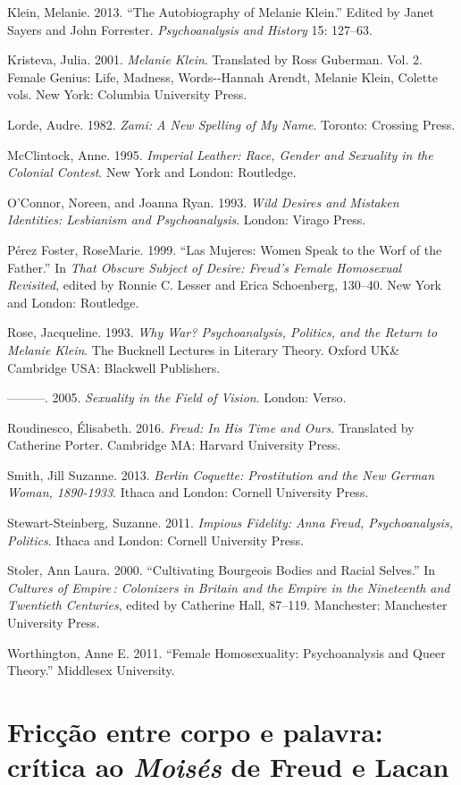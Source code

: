 Klein, Melanie. 2013. ``The Autobiography of Melanie Klein.'' Edited by
Janet Sayers and John Forrester. \emph{Psychoanalysis and History} 15:
127--63.

Kristeva, Julia. 2001. \emph{Melanie Klein}. Translated by Ross
Guberman. Vol. 2. Female Genius: Life, Madness, Words-\/-Hannah Arendt,
Melanie Klein, Colette vols. New York: Columbia University Press.

Lorde, Audre. 1982. \emph{Zami: A New Spelling of My Name}. Toronto:
Crossing Press.

McClintock, Anne. 1995. \emph{Imperial Leather: Race, Gender and
Sexuality in the Colonial Contest}. New York and London: Routledge.

O'Connor, Noreen, and Joanna Ryan. 1993. \emph{Wild Desires and Mistaken
Identities: Lesbianism and Psychoanalysis}. London: Virago Press.

Pérez Foster, RoseMarie. 1999. ``Las Mujeres: Women Speak to the Worf of
the Father.'' In \emph{That Obscure Subject of Desire: Freud's Female
Homosexual Revisited}, edited by Ronnie C. Lesser and Erica Schoenberg,
130--40. New York and London: Routledge.

Rose, Jacqueline. 1993. \emph{Why War? Psychoanalysis, Politics, and the
Return to Melanie Klein}. The Bucknell Lectures in Literary Theory.
Oxford UK\& Cambridge USA: Blackwell Publishers.

---------. 2005. \emph{Sexuality in the Field of Vision}. London: Verso.

Roudinesco, Élisabeth. 2016. \emph{Freud: In His Time and Ours}.
Translated by Catherine Porter. Cambridge MA: Harvard University Press.

Smith, Jill Suzanne. 2013. \emph{Berlin Coquette: Prostitution and the
New German Woman, 1890-1933}. Ithaca and London: Cornell University
Press.

Stewart-Steinberg, Suzanne. 2011. \emph{Impious Fidelity: Anna Freud,
Psychoanalysis, Politics}. Ithaca and London: Cornell University Press.

Stoler, Ann Laura. 2000. ``Cultivating Bourgeois Bodies and Racial
Selves.'' In \emph{Cultures of Empire\,: Colonizers in Britain and the
Empire in the Nineteenth and Twentieth Centuries}, edited by Catherine
Hall, 87--119. Manchester: Manchester University Press.

Worthington, Anne E. 2011. ``Female Homosexuality: Psychoanalysis and
Queer Theory.'' Middlesex University.

\chapter*{Fricção entre corpo e palavra: crítica ao \emph{Moisés} de Freud e Lacan}

